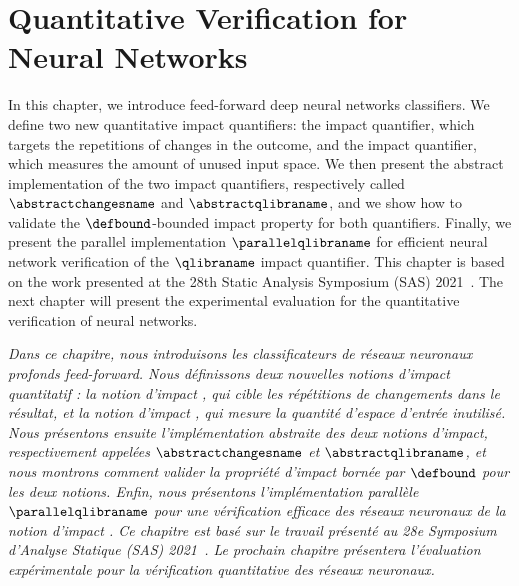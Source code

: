 \setchapterpreamble[u]{\margintoc}


\chapter{Quantitative Verification for Neural Networks}

In this chapter, we introduce feed-forward deep neural networks classifiers.
We define two new quantitative impact quantifiers: the \changesname{} impact quantifier, which targets the repetitions of changes in the outcome, and the \qlibraname{} impact quantifier, which measures the amount of unused input space. We then present the abstract implementation of the two impact quantifiers, respectively called $\abstractchangesname$ and $\abstractqlibraname$, and we show how to validate the $\defbound$-bounded impact property for both quantifiers. Finally, we present the parallel implementation $\parallelqlibraname$ for efficient neural network verification of the $\qlibraname$ impact quantifier.
This chapter is based on the work presented at the 28th Static Analysis Symposium (SAS) 2021~\cite{Mazzucato2021}.
The next chapter will present the experimental evaluation for the quantitative verification of neural networks.

\emph{Dans ce chapitre, nous introduisons les classificateurs de réseaux neuronaux profonds feed-forward. Nous définissons deux nouvelles notions d'impact quantitatif : la notion d'impact \changesname{}, qui cible les répétitions de changements dans le résultat, et la notion d'impact \qlibraname{}, qui mesure la quantité d'espace d'entrée inutilisé. Nous présentons ensuite l'implémentation abstraite des deux notions d'impact, respectivement appelées $\abstractchangesname$ et $\abstractqlibraname$, et nous montrons comment valider la propriété d'impact bornée par $\defbound$ pour les deux notions. Enfin, nous présentons l'implémentation parallèle $\parallelqlibraname$ pour une vérification efficace des réseaux neuronaux de la notion d'impact \qlibraname{}. Ce chapitre est basé sur le travail présenté au 28e Symposium d'Analyse Statique (SAS) 2021~. Le prochain chapitre présentera l'évaluation expérimentale pour la vérification quantitative des réseaux neuronaux.}

% 
% 
% 
% 
% 

